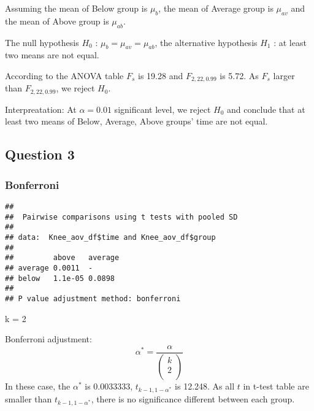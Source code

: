 \documentclass[]{article}
\newenvironment{Shaded}{\begin{snugshade}}{\end{snugshade}}
\newcommand{\KeywordTok}[1]{\textcolor[rgb]{0.13,0.29,0.53}{\textbf{#1}}}
\newcommand{\DataTypeTok}[1]{\textcolor[rgb]{0.13,0.29,0.53}{#1}}
\newcommand{\DecValTok}[1]{\textcolor[rgb]{0.00,0.00,0.81}{#1}}
\newcommand{\StringTok}[1]{\textcolor[rgb]{0.31,0.60,0.02}{#1}}
\newcommand{\OperatorTok}[1]{\textcolor[rgb]{0.81,0.36,0.00}{\textbf{#1}}}
\newcommand{\NormalTok}[1]{#1}
\begin{document}
Assuming the mean of Below group is \(\mu_b\), the mean of Average group
is \(\mu_{av}\) and the mean of Above group is \(\mu_{ab}\).

The null hypothesis \(H_0\) : \(\mu_b = \mu_{av} = \mu_{ab}\), the
alternative hypothesis \(H_1\) : at least two means are not equal.

According to the ANOVA table \(F_s\) is 19.28 and \(F_{2,22,0.99}\) is
5.72. As \(F_s\) larger than \(F_{2,22,0.99}\), we reject \(H_0\).

Interpreatation: At \(\alpha = 0.01\) significant level, we reject
\(H_0\) and conclude that at least two means of Below, Average, Above
groups' time are not equal.

\subsection{Question 3}\label{question-3-1}

\subsubsection{Bonferroni}\label{bonferroni}

\begin{Shaded}
\end{Shaded}

\begin{verbatim}
## 
##  Pairwise comparisons using t tests with pooled SD 
## 
## data:  Knee_aov_df$time and Knee_aov_df$group 
## 
##         above   average
## average 0.0011  -      
## below   1.1e-05 0.0898 
## 
## P value adjustment method: bonferroni
\end{verbatim}

\begin{Shaded}
\begin{Highlighting}[]
\NormalTok{k =}\StringTok{ }\DecValTok{2}
\end{Highlighting}
\end{Shaded}

Bonferroni adjustment:
\[\alpha^* = \frac{\alpha}{\begin{pmatrix} k \\ 2 \\ \end{pmatrix}} \]
In these case, the \(\alpha^*\) is 0.0033333, \(t_{k-1,1-{\alpha^*}}\)
is 12.248. As all \(t\) in t-test table are smaller than
\(t_{k-1,1-{\alpha^*}}\), there is no significance different between
each group.
\end{document}
